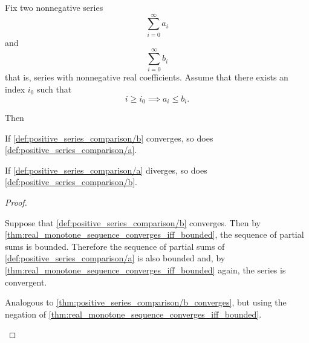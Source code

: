 \begin{proposition}\label{thm:positive_series_comparison}\cite[]{Фихтенгольц1968/2}
  Fix two nonnegative series
  \begin{equation}\label{def:positive_series_comparison/a}
    \sum_{i=0}^\infty a_i
  \end{equation}
  and
  \begin{equation}\label{def:positive_series_comparison/b}
    \sum_{i=0}^\infty b_i
  \end{equation}
  that is, series with nonnegative real coefficients. Assume that there exists an index \( i_0 \) such that
  \begin{equation*}
    i \geq i_0 \implies a_i \leq b_i.
  \end{equation*}

  Then
  \begin{thmenum}
     If \cref{def:positive_series_comparison/b} converges, so does \cref{def:positive_series_comparison/a}.

     If \cref{def:positive_series_comparison/a} diverges, so does \cref{def:positive_series_comparison/b}.
  \end{thmenum}
\end{proposition}
\begin{proof}
  \begin{description}
     Suppose that \cref{def:positive_series_comparison/b} converges. Then by \cref{thm:real_monotone_sequence_converges_iff_bounded}, the sequence of partial sums is bounded. Therefore the sequence of partial sums of \cref{def:positive_series_comparison/a} is also bounded and, by \cref{thm:real_monotone_sequence_converges_iff_bounded} again, the series is convergent.

     Analogous to \cref{thm:positive_series_comparison/b_converges}, but using the negation of \cref{thm:real_monotone_sequence_converges_iff_bounded}.
  \end{description}
\end{proof}

